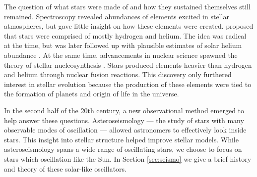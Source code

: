 


The question of what stars were made of and how they sustained themselves still remained. Spectroscopy revealed abundances of elements excited in stellar atmospheres, but gave little insight on how these elements were created. \citet{Payne1925} proposed that stars were comprised of mostly hydrogen and helium. The idea was radical at the time, but was later followed up with plausible estimates of solar helium abundance \citep[e.g.][]{Schwarzschild1946}. At the same time, advancements in nuclear science spawned the theory of stellar nucleosynthesis \citep{Hoyle1946}. Stars produced elements heavier than hydrogen and helium through nuclear fusion reactions. This discovery only furthered interest in stellar evolution because the production of these elements were tied to the formation of planets and origin of life in the universe.

In the second half of the 20th century, a new observational method emerged to help answer these questions. Asteroseismology --- the study of stars with many observable modes of oscillation --- allowed astronomers to effectively look inside stars. This insight into stellar structure helped improve stellar models. While asteroseismology spans a wide range of oscillating stars, we choose to focus on stars which oscillation like the Sun. In Section \ref{sec:seismo} we give a brief history and theory of these solar-like oscillators.

